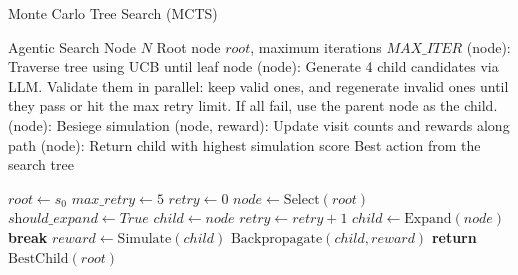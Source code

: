 \begin{algorithm}
\caption{Monte Carlo Tree Search (MCTS)}
\label{alg:mcts}
\begin{algorithmic}[1]
\Require Agentic Search Node $N$
\Require Root node $root$, maximum iterations $MAX\_ITER$
\Require {}(node): Traverse tree using UCB until leaf node
\Require {}(node): Generate 4 child candidates via LLM. Validate them in parallel: keep valid ones, and regenerate invalid ones until they pass or hit the max retry limit. If all fail, use the parent node as the child.
\Require {}(node): Besiege simulation
\Require {}(node, reward): Update visit counts and rewards along path
\Require {}(node): Return child with highest simulation score
\Ensure Best action from the search tree

\State $root \gets s_0$
\State $max\_retry \gets 5$
    \State $retry \gets 0$
    \State $node \gets \text{Select}(root)$ 
        \State $\textit{should\_expand} \gets True$
    \EndIf
        \State $child \gets node$ 
    \EndIf
        \State $retry \gets retry + 1$
        \State $child \gets \text{Expand}(node)$ 
            \State \textbf{break} 
        \EndIf
    \EndWhile
    \State $reward \gets \text{Simulate}(child)$ 
    \State $\text{Backpropagate}(child, reward)$ 
\EndFor
\State \textbf{return} $\text{BestChild}(root)$ 
\end{algorithmic}
\end{algorithm}



